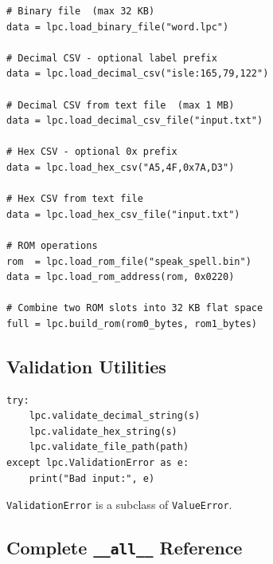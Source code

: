 \documentclass[10pt]{article}
\begin{document}
\begin{lstlisting}[caption={Input loader functions}]
# Binary file  (max 32 KB)
data = lpc.load_binary_file("word.lpc")

# Decimal CSV - optional label prefix
data = lpc.load_decimal_csv("isle:165,79,122")

# Decimal CSV from text file  (max 1 MB)
data = lpc.load_decimal_csv_file("input.txt")

# Hex CSV - optional 0x prefix
data = lpc.load_hex_csv("A5,4F,0x7A,D3")

# Hex CSV from text file
data = lpc.load_hex_csv_file("input.txt")

# ROM operations
rom  = lpc.load_rom_file("speak_spell.bin")
data = lpc.load_rom_address(rom, 0x0220)

# Combine two ROM slots into 32 KB flat space
full = lpc.build_rom(rom0_bytes, rom1_bytes)
\end{lstlisting}

\subsection{Validation Utilities}

\begin{lstlisting}[caption={Input validation}]
try:
    lpc.validate_decimal_string(s)
    lpc.validate_hex_string(s)
    lpc.validate_file_path(path)
except lpc.ValidationError as e:
    print("Bad input:", e)
\end{lstlisting}

\texttt{ValidationError} is a subclass of \texttt{ValueError}.

\subsection{Complete \texttt{\_\_all\_\_} Reference}
\end{document}
